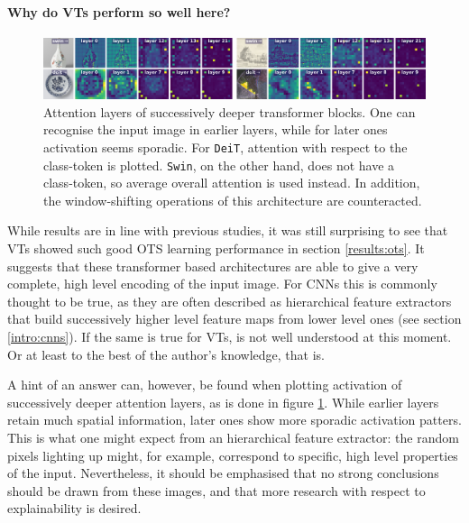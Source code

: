 \paragraph{Why do VTs perform so well here?}

\begin{figure}[tb]
    \includegraphics[width=\textwidth]{img/layers.png}
    \caption{Attention layers of successively deeper transformer blocks. One can recognise the input image in earlier layers, while for later ones activation seems sporadic. For \texttt{DeiT}, attention with respect to the class-token is plotted. \texttt{Swin}, on the other hand, does not have a class-token, so average overall attention is used instead. In addition, the window-shifting operations of this architecture are counteracted.}
    \label{results:img:layers}
\end{figure}

While results are in line with previous studies, it was still surprising to see that VTs showed such good OTS learning performance in section \ref{results:ots}. It suggests that these transformer based architectures are able to give a very complete, high level encoding of the input image. For CNNs this is commonly thought to be true, as they are often described as hierarchical feature extractors that build successively higher level feature maps from lower level ones (see section \ref{intro:cnns}). If the same is true for VTs, is not well understood at this moment. Or at least to the best of the author's knowledge, that is.

A hint of an answer can, however, be found when plotting activation of successively deeper attention layers, as is done in figure \ref{results:img:layers}. While earlier layers retain much spatial information, later ones show more sporadic activation patters. This is what one might expect from an hierarchical feature extractor: the random pixels lighting up might, for example, correspond to specific, high level properties of the input. Nevertheless, it should be emphasised that no strong conclusions should be drawn from these images, and that more research with respect to explainability is desired.

